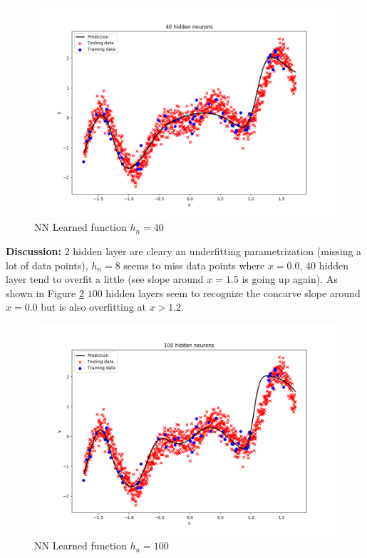 \documentclass[12pt,a4paper]{article}
\begin{document}
\begin{enumerate}[a)]
\begin{figure}[H]
	\centering
  \includegraphics[width=\textwidth]{figures/1_1_a_hn_40.png}
	\caption{NN Learned function $h_n=40$}
	\label{1_1_a_hn_40}
\end{figure}
  
\textbf{Discussion: } $2$ hidden layer are cleary an underfitting
parametrization (missing a lot of data points), $h_n = 8$ seems to miss data
points where $ x = 0.0$, $40$ hidden layer tend to overfit a little (see slope
around $x = 1.5$ is going up again). As shown in Figure \ref{1_1_a_hn_100} $100$
hidden layers seem to recognize the concarve slope around $x = 0.0$ but is also
overfitting at $x > 1.2$.

\begin{figure}[H]
	\centering
  \includegraphics[width=\textwidth]{figures/1_1_a_hn_100.png}
	\caption{NN Learned function $h_n=100$}
	\label{1_1_a_hn_100}
\end{figure}


\end{enumerate}
\end{document}
